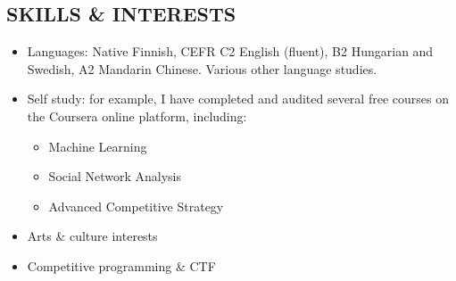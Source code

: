 \documentclass[margin, 10pt]{res} %
\begin{document}
\begin{resume}
\section{SKILLS \& INTERESTS}
\begin{itemize} \itemsep -2pt
\item Languages: Native Finnish, CEFR C2 English (fluent), B2 Hungarian and Swedish, A2 Mandarin Chinese. Various other language studies.
\item Self study: for example, I have completed and audited several free courses on the Coursera online platform, including:
  \begin{itemize} \itemsep -2pt
  \item Machine Learning
  \item Social Network Analysis
  \item Advanced Competitive Strategy
  \end{itemize}
\item Arts \& culture interests
\item Competitive programming \& CTF
\end{itemize}


\end{resume}
\end{document}
